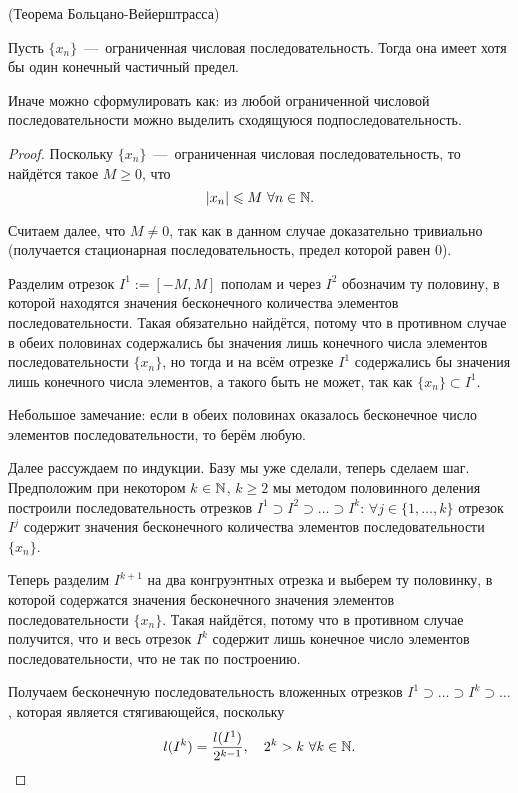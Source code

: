 \newpage
\begin{theorem}
    \hypertarget{thm2.8}{(Теорема Больцано-Вейерштрасса)} Пусть $\{ x_{n} \}$~---~ограниченная числовая последовательность. Тогда она имеет хотя бы один конечный частичный предел.
\end{theorem}
\begin{note}
    Иначе можно сформулировать как: из любой ограниченной числовой последовательности можно выделить сходящуюся подпоследовательность.
\end{note}
\begin{proof}
    Поскольку $\{ x_{n} \}$~---~ограниченная числовая последовательность, то найдётся такое $M \geq 0$, что
    $$ |x_{n}| \leqslant M \  \forall n \in \mathbb{N}.$$

    Считаем далее, что $M \neq 0$, так как в данном случае доказательно тривиально (получается стационарная последовательность, предел которой равен 0). 

    Разделим отрезок $I^{1} := [-M, M]$ пополам и через $I^{2}$ обозначим ту половину, в которой находятся значения бесконечного количества элементов последовательности. Такая обязательно найдётся, потому что в противном случае в обеих половинах содержались бы значения лишь конечного числа элементов последовательности $\{ x_{n} \}$, но тогда и на всём отрезке $I^{1}$ содержались бы значения лишь конечного числа элементов, а такого быть не может, так как $\{ x_{n} \} \subset I^{1}$.

    Небольшое замечание: если в обеих половинах оказалось бесконечное число элементов последовательности, то берём любую.

    Далее рассуждаем по индукции. Базу мы уже сделали, теперь сделаем шаг. Предположим при некотором $k \in \mathbb{N}$, $k \geq 2$ мы методом половинного деления построили последовательность отрезков $I^{1} \supset I^{2} \supset \ldots \supset I^{k}$: $\forall j \in \{ 1, \ldots, k \}$ отрезок $I^{j}$ содержит значения бесконечного количества элементов последовательности $\{ x_{n} \}$.

    Теперь разделим $I^{k + 1}$ на два конгруэнтных отрезка и выберем ту половинку, в которой содержатся значения бесконечного значения элементов последовательности $\{ x_{n} \}$. Такая найдётся, потому что в противном случае получится, что и весь отрезок $I^{k}$ содержит лишь конечное число элементов последовательности, что не так по построению.

    Получаем бесконечную последовательность вложенных отрезков $I^{1} \supset \ldots \supset I^{k} \supset \ldots$, которая является стягивающейся, поскольку
    $$ l (I^{k}) = \frac{l (I^{1})}{2^{k - 1}}, \quad 2^{k} > k \  \forall k \in \mathbb{N}.$$


\end{proof}
